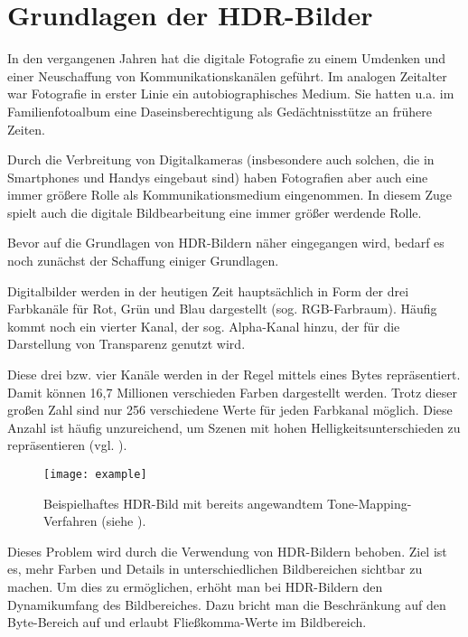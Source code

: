 
\chapter{Grundlagen der HDR-Bilder}
\label{chap:hdr}


In den vergangenen Jahren hat die digitale Fotografie zu einem Umdenken und einer Neuschaffung von Kommunikationskanälen geführt. Im analogen Zeitalter war Fotografie in erster Linie ein autobiographisches Medium.  Sie hatten u.a. im Familienfotoalbum eine Daseinsberechtigung als Gedächtnisstütze an frühere Zeiten.

Durch die Verbreitung von Digitalkameras (insbesondere auch solchen, die in Smartphones und Handys eingebaut sind) haben Fotografien aber auch eine immer größere Rolle als Kommunikationsmedium eingenommen. 
In diesem Zuge spielt auch die digitale Bildbearbeitung eine immer größer werdende Rolle. 

Bevor auf die Grundlagen von \gls{HDR}-Bildern näher eingegangen wird, bedarf es noch zunächst der Schaffung einiger Grundlagen.

Digitalbilder werden in der heutigen Zeit hauptsächlich in Form der drei Farbkanäle für Rot, Grün und Blau dargestellt (sog. \gls{RGB-Farbraum}). Häufig kommt noch ein vierter Kanal, der sog. Alpha-Kanal hinzu, der für die Darstellung von Transparenz genutzt wird. 

Diese drei bzw. vier Kanäle werden in der Regel mittels eines Bytes repräsentiert. Damit können 16,7 Millionen verschieden Farben dargestellt werden. Trotz dieser großen Zahl sind nur 256 verschiedene Werte für jeden Farbkanal möglich. Diese Anzahl ist häufig unzureichend, um Szenen mit hohen Helligkeitsunterschieden zu repräsentieren (vgl. \cite[S.~1f]{Reinhard}).


\begin{figure}[h]
  \begin{center}
    \texttt{[image: example]}
    \caption{Beispielhaftes \gls{HDR}-Bild mit bereits angewandtem \gls{Tone-Mapping}-Verfahren (siehe \cite{tellone}). }
    \label{fig:teezer}
  \end{center}
\end{figure}

Dieses Problem wird durch die Verwendung von \gls{HDR}-Bildern behoben. Ziel ist es, mehr Farben und Details in unterschiedlichen Bildbereichen sichtbar zu machen. Um dies zu ermöglichen, erhöht man bei \gls{HDR}-Bildern den \gls{Dynamikumfang} des Bildbereiches. Dazu bricht man die Beschränkung auf den Byte-Bereich auf und erlaubt Fließkomma-Werte im Bildbereich.

